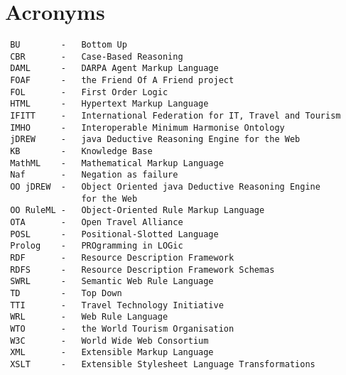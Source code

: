 \chapter*{Acronyms}

\singlespacing
\begin{verbatim}
 BU        -   Bottom Up
 CBR       -   Case-Based Reasoning
 DAML      -   DARPA Agent Markup Language
 FOAF      -   the Friend Of A Friend project
 FOL       -   First Order Logic 
 HTML      -   Hypertext Markup Language
 IFITT     -   International Federation for IT, Travel and Tourism
 IMHO      -   Interoperable Minimum Harmonise Ontology
 jDREW     -   java Deductive Reasoning Engine for the Web
 KB        -   Knowledge Base
 MathML    -   Mathematical Markup Language
 Naf       -   Negation as failure
 OO jDREW  -   Object Oriented java Deductive Reasoning Engine 
               for the Web
 OO RuleML -   Object-Oriented Rule Markup Language
 OTA       -   Open Travel Alliance
 POSL      -   Positional-Slotted Language
 Prolog    -   PROgramming in LOGic
 RDF       -   Resource Description Framework
 RDFS      -   Resource Description Framework Schemas
 SWRL      -   Semantic Web Rule Language
 TD        -   Top Down
 TTI       -   Travel Technology Initiative
 WRL       -   Web Rule Language
 WTO       -   the World Tourism Organisation
 W3C       -   World Wide Web Consortium
 XML       -   Extensible Markup Language
 XSLT      -   Extensible Stylesheet Language Transformations 
 \end{verbatim}
 \doublespacing